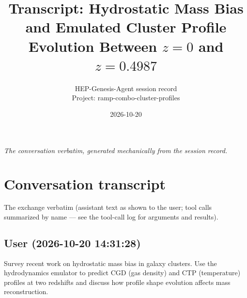 \documentclass[11pt,a4paper]{article}
\title{Transcript: Hydrostatic Mass Bias and Emulated Cluster Profile Evolution Between $z=0$ and $z=0.4987$}
\author{HEP-Genesis-Agent session record \\ \small Project: ramp-combo-cluster-profiles}
\date{2026-10-20}
\begin{document}
\maketitle
\noindent\textit{\small The conversation verbatim, generated mechanically from the session record.}
\vspace{1em}



\appendix
\section{Conversation transcript}
\label{app:transcript}
The exchange verbatim (assistant text as shown to the user; tool calls summarized by name --- see the tool-call log for arguments and results).
\subsection*{User \small(2026-10-20 14:31:28)}
Survey recent work on hydrostatic mass bias in galaxy clusters. Use the hydrodynamics emulator to predict CGD (gas density) and CTP (temperature) profiles at two redshifts and discuss how profile shape evolution affects mass reconstruction.
\end{document}
